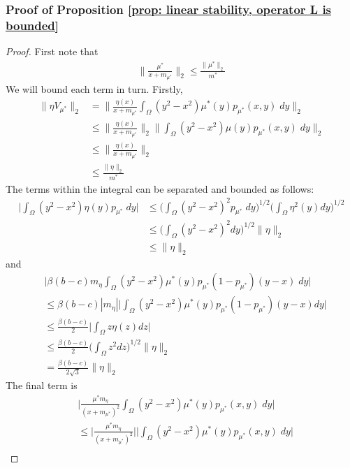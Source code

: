 \documentclass[10pt]{article}
\begin{document}
\subsubsection*{Proof of Proposition \ref{prop: linear stability, operator L is bounded}}
\begin{proof}
First note that
\begin{align*}
    \bigg\|\frac{\mu^*}{x+m_{\mu^*}}\bigg\|_2 \leq \frac{\|\mu^*\|_2}{m^*}
\end{align*}
We will bound each term in turn. Firstly,
\begin{align*}
 \| \eta V_{\mu^*}\|_2 &= 
    \bigg\|\frac{\eta(x)}{x + m_{\mu^*}}\int_\Omega(y^2-x^2)\mu^*(y)p_{\mu^*}(x,y)\; dy\bigg\|_2\\ &\leq \bigg\|\frac{\eta(x)}{x + m_{\mu^*}}\bigg\|_2\bigg\|\int_\Omega(y^2-x^2)\mu(y)p_{\mu^*}(x,y)\; dy\bigg\|_2\\
    &\leq \bigg\|\frac{\eta(x)}{x + m_{\mu^*}}\bigg\|_2\\
    &\leq \frac{\|\eta\|_2}{m^*}
\end{align*}
The terms within the integral can be separated and bounded as follows: 
\begin{align*}
    \bigg|\int_\Omega(y^2-x^2) \eta(y) p_{\mu^*}\; dy\bigg| &\leq \bigg(\int_\Omega(y^2-x^2)^2  p_{\mu^*}\; dy\bigg)^{1/2}\bigg(\int_\Omega\eta^2(y) dy\bigg)^{1/2}\\
    &\leq \bigg(\int_\Omega(y^2-x^2)^2  dy\bigg)^{1/2}\|\eta\|_2 \\
    &\leq \|\eta\|_2
\end{align*}
and
\begin{align*}
    &\bigg|\beta(b-c)m_\eta\int_\Omega(y^2-x^2)\mu^*(y)p_{\mu^*}(1-p_{\mu^*})(y-x)\; dy\bigg|\\ &\leq \beta(b-c)|m_\eta|\bigg|\int_\Omega(y^2-x^2)\mu^*(y)p_{\mu^*}(1-p_{\mu^*})(y-x)dy\bigg|\\
    &\leq \frac{\beta(b-c)}{2} \bigg|\int_\Omega z\eta(z) dz\bigg|\\
    &\leq \frac{\beta(b-c)}{2}\bigg(\int_\Omega z^2dz\bigg)^{1/2}\|\eta\|_2\\
    &= \frac{\beta (b-c)}{2\sqrt{3}}\|\eta\|_2
\end{align*}
The final term is
\begin{align*}
&\bigg|\frac{\mu^*m_\eta}{(x + m_{\mu^*})^2}\int_\Omega(y^2-x^2)\mu^*(y)p_{\mu^*}(x,y)\; dy\bigg|\\ &\leq \bigg|\frac{\mu^*m_\eta}{(x + m_{\mu^*})^2}\bigg|\bigg|\int_\Omega(y^2-x^2)\mu^*(y)p_{\mu^*}(x,y)\; dy\bigg| \\

\end{align*}
\end{proof}
\end{document}
